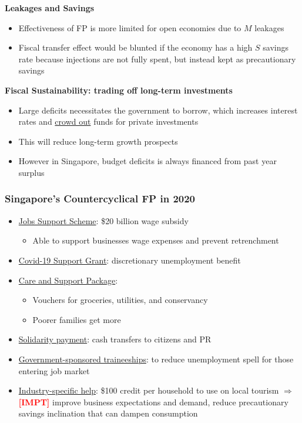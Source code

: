 \documentclass{article}
\newcommand{\impt}[0]{\textcolor{red}{\textbf{[IMPT] }}}
\begin{document}
\begin{multicols}{2}
\textbf{Leakages and Savings}
\begin{itemize}
	\item Effectiveness of FP is more limited for open economies due to $M$ leakages
	\item Fiscal transfer effect would be blunted if the economy has a high $S$ savings rate because injections are not fully spent, but instead kept as precautionary savings
\end{itemize}
\textbf{Fiscal Sustainability: trading off long-term investments}
\begin{itemize}
	\item Large deficits necessitates the government to borrow, which increases interest rates and \underline{crowd out} funds for private investments
	\item This will reduce long-term growth prospects
	\item However in Singapore, budget deficits is always financed from past year surplus
\end{itemize}
\subsubsection{Singapore's Countercyclical FP in 2020}
\begin{itemize}
	\item \underline{Jobs Support Scheme}: \$20 billion wage subsidy
	\begin{itemize}
		\item Able to support businesses wage expenses and prevent retrenchment
	\end{itemize}
    \item \underline{Covid-19 Support Grant}: discretionary unemployment benefit
    \item \underline{Care and Support Package}:
    \begin{itemize}
    	\item Vouchers for groceries, utilities, and conservancy
    	\item Poorer families get more
    \end{itemize}
    \item \underline{Solidarity payment}: cash transfers to citizens and PR
    \item \underline{Government-sponsored traineeships}: to reduce unemployment spell for those entering job market
    \item \underline{Industry-specific help}: \$100 credit per household to use on local tourism $\Rightarrow$ \impt improve business expectations and demand, reduce precautionary savings inclination that can dampen consumption
\end{itemize}


\end{multicols}
\end{document}
